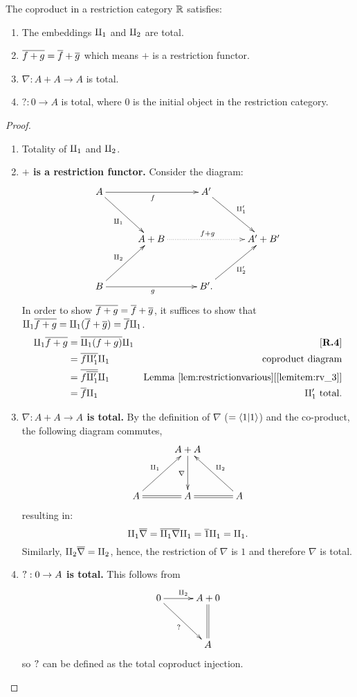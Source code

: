 \begin{lemma}\label{lem:restriction_coproduct_is_restriction_functor}
  The  coproduct in a restriction category $\mathbb{R}$ satisfies:
  \begin{enumerate}[{(}i{)}]
    \item The embeddings $\amalg_{1}$ and $\amalg_{2}$ are total.
    \item $\overline{f+g} = \overline{f} + \overline{g}$ which means $+$ is a restriction functor.
    \item $\nabla:A+A\to A$ is total.
    \item $?:0 \to A$ is total, where $0$ is the initial object in the restriction category.
  \end{enumerate}
\end{lemma}
\begin{proof}
  \prepprooflist
  \begin{enumerate}[{(}i{)}]
    \item Totality of $\amalg_{1}$ and $\amalg_{2}$.
    \item \textbf{$+$ is a restriction functor.}
      Consider the diagram:
      \[
        \xymatrix @C=30pt @R=35pt{
          A \ar[rr]_{f} \ar[dr]_{\cpa} && A' \ar[dr]^{\cpa'}\\
          &A+B \ar@{.>}[rr]^{f+g} & & A' + B'\\
          B \ar[rr]_{g} \ar[ur]^{\cpb} && B'. \ar[ur]_{\cpb'}
        }
      \]
      In order to show $\overline{f+g} = \overline{f} + \overline{g}$, it suffices to show that
      $\amalg_{1}\overline{f+g} = \amalg_{1}(\overline{f} + \overline{g}) = \overline{f}\amalg_{1}$.
      \begin{align*}
        \cpa\restr{f+g} &= \restr{\cpa(f+g)}\cpa & \rfour\\
        &= \restr{f \cpa'} \cpa &\text{coproduct diagram}\\
        &= \restr{f \restr{\cpa'}} \cpa
          & \text{Lemma }\refitem{lem:restrictionvarious}{lemitem:rv_3}\\
        &= \restr{f} \cpa & \cpa'\text{ total}.
      \end{align*}
    \item   \textbf{$\nabla:A+A\to A$ is total.}
      By the definition of $\nabla$ ($=\langle1 | 1 \rangle$) and the co-product, the following diagram
      commutes,
      \[
        \xymatrix @C=30pt @R=35pt{
          &A + A \ar[d]_{\nabla}\\
          A \ar@{=}[r] \ar[ur]^{\cpa}&A \ar@{=}[r] & A \ar[ul]_{\cpb}
        }
      \]
      resulting in:
      \[
         \amalg_{1} \overline{\nabla}  = \overline{\amalg_{1} \nabla} \amalg_{1} = \overline{1} \amalg_{1} = \amalg_{1}.
      \]
      Similarly, $\amalg_{2} \overline{\nabla} = \amalg_{2}$, hence, the restriction of $\nabla$ is $1$ and
      therefore $\nabla$ is total.
    \item  \textbf{$\mathbf{?}:0 \to A$ is total.}
      This follows from
      \[
        \xymatrix @C=30pt @R=35pt{
          0 \ar[dr]_{\why} \ar[r]^{\cpb} &A + 0 \\
          & A \ar@{=}[u]
        }
      \]
      so $\mathbf{?}$ can be defined as the total coproduct injection.
  \end{enumerate}



\end{proof}

